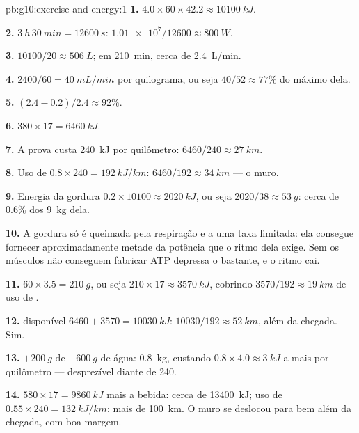 \begin{solution}{pb:g10:exercise-and-energy:1}
\textbf{1.} $4.0 \times 60 \times 42.2 \approx \qty{10100}{kJ}$.

\textbf{2.} $\qty{3}{h}\,\qty{30}{min} = \qty{12600}{s}$:
$\num{1.01e7}/12600 \approx \qty{800}{W}$.

\textbf{3.} $10100/20 \approx \qty{506}{L}$; em \qty{210}{min}, cerca
de \qty{2.4}{L/min}.

\textbf{4.} $2400/60 = \qty{40}{mL/min}$ por quilograma, ou seja $40/52
\approx 77\%$ do máximo dela.

\textbf{5.} $(2.4 - 0.2)/2.4 \approx 92\%$.

\textbf{6.} $380 \times 17 = \qty{6460}{kJ}$.

\textbf{7.} A prova custa \qty{240}{kJ} por quilômetro: $6460/240
\approx \qty{27}{km}$.

\textbf{8.} Uso de  $0.8 \times 240 = \qty{192}{kJ/km}$:
$6460/192 \approx \qty{34}{km}$ --- o muro.

\textbf{9.} Energia da gordura $0.2 \times 10100 \approx \qty{2020}{kJ}$,
ou seja $2020/38 \approx \qty{53}{g}$: cerca de 0.6\% dos \qty{9}{kg}
dela.

\textbf{10.} A gordura só é queimada pela respiração e a uma taxa
limitada: ela consegue fornecer aproximadamente metade da potência que
o ritmo dela exige. Sem  os músculos não conseguem fabricar
ATP depressa o bastante, e o ritmo cai.

\textbf{11.} $60 \times 3.5 = \qty{210}{g}$, ou seja $210 \times 17 \approx
\qty{3570}{kJ}$, cobrindo $3570/192 \approx \qty{19}{km}$ de uso de
.

\textbf{12.}  disponível $6460 + 3570 = \qty{10030}{kJ}$:
$10030/192 \approx \qty{52}{km}$, além da chegada. Sim.

\textbf{13.} $+\qty{200}{g}$ de  $+ \qty{600}{g}$ de água:
\qty{0.8}{kg}, custando $0.8 \times 4.0 \approx \qty{3}{kJ}$ a mais por
quilômetro --- desprezível diante de 240.

\textbf{14.}  $580 \times 17 = \qty{9860}{kJ}$ mais a bebida:
cerca de \qty{13400}{kJ}; uso de  $0.55 \times 240 =
\qty{132}{kJ/km}$: mais de \qty{100}{km}. O muro se deslocou para bem
além da chegada, com boa margem.


\end{solution}
